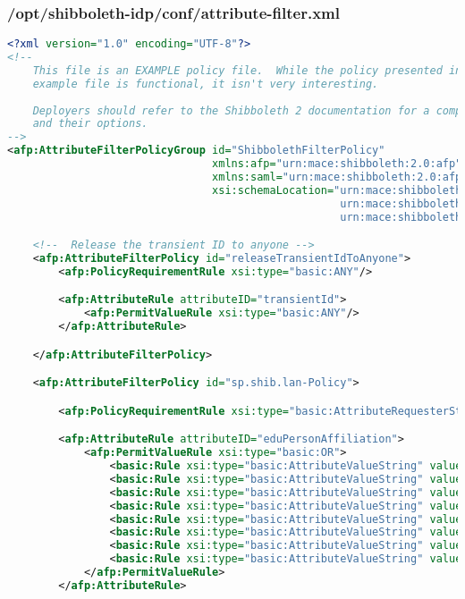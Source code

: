 \subsubsection{/opt/shibboleth-idp/conf/attribute-filter.xml}
\begin{lstlisting}[language=xml]
<?xml version="1.0" encoding="UTF-8"?>
<!-- 
    This file is an EXAMPLE policy file.  While the policy presented in this 
    example file is functional, it isn't very interesting.
    
    Deployers should refer to the Shibboleth 2 documentation for a complete list of components 
    and their options.
-->
<afp:AttributeFilterPolicyGroup id="ShibbolethFilterPolicy"
                                xmlns:afp="urn:mace:shibboleth:2.0:afp" xmlns:basic="urn:mace:shibboleth:2.0:afp:mf:basic" 
                                xmlns:saml="urn:mace:shibboleth:2.0:afp:mf:saml" xmlns:xsi="http://www.w3.org/2001/XMLSchema-instance" 
                                xsi:schemaLocation="urn:mace:shibboleth:2.0:afp classpath:/schema/shibboleth-2.0-afp.xsd
                                                    urn:mace:shibboleth:2.0:afp:mf:basic classpath:/schema/shibboleth-2.0-afp-mf-basic.xsd
                                                    urn:mace:shibboleth:2.0:afp:mf:saml classpath:/schema/shibboleth-2.0-afp-mf-saml.xsd">

    <!--  Release the transient ID to anyone -->
    <afp:AttributeFilterPolicy id="releaseTransientIdToAnyone">
        <afp:PolicyRequirementRule xsi:type="basic:ANY"/>

        <afp:AttributeRule attributeID="transientId">
            <afp:PermitValueRule xsi:type="basic:ANY"/>
        </afp:AttributeRule>

    </afp:AttributeFilterPolicy>

    <afp:AttributeFilterPolicy id="sp.shib.lan-Policy">

        <afp:PolicyRequirementRule xsi:type="basic:AttributeRequesterString" value="https://sp.shib.lan/shibboleth" />

        <afp:AttributeRule attributeID="eduPersonAffiliation">
            <afp:PermitValueRule xsi:type="basic:OR">
                <basic:Rule xsi:type="basic:AttributeValueString" value="faculty" ignoreCase="true" />
                <basic:Rule xsi:type="basic:AttributeValueString" value="student" ignoreCase="true" />
                <basic:Rule xsi:type="basic:AttributeValueString" value="staff" ignoreCase="true" />
                <basic:Rule xsi:type="basic:AttributeValueString" value="alum" ignoreCase="true" />
                <basic:Rule xsi:type="basic:AttributeValueString" value="member" ignoreCase="true" />
                <basic:Rule xsi:type="basic:AttributeValueString" value="affiliate" ignoreCase="true" />
                <basic:Rule xsi:type="basic:AttributeValueString" value="employee" ignoreCase="true" />
                <basic:Rule xsi:type="basic:AttributeValueString" value="library-walk-in" ignoreCase="true" />
            </afp:PermitValueRule>
        </afp:AttributeRule>


\end{lstlisting}
